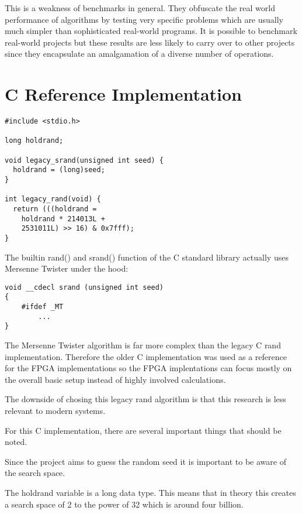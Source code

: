 \documentclass{article}
\begin{document}
    This is a weakness of benchmarks in general. They obfuscate the real world performance
    of algorithms by testing very specific problems which are usually much simpler
    than sophisticated real-world programs. It is possible to benchmark real-world
    projects but these results are less likely to carry over to other projects since
    they encapsulate an amalgamation of a diverse number of operations.

    \section{C Reference Implementation}

    \lstset{language=C}

    \begin{lstlisting}
#include <stdio.h>

long holdrand;

void legacy_srand(unsigned int seed) {
  holdrand = (long)seed;
}

int legacy_rand(void) {
  return (((holdrand =
    holdrand * 214013L +
    2531011L) >> 16) & 0x7fff);
}
    \end{lstlisting}

    The builtin rand() and srand() function of the C
    standard library actually uses Mersenne Twister under the
    hood:

    \begin{lstlisting}
void __cdecl srand (unsigned int seed)
{
    #ifdef _MT
        ...
}
    \end{lstlisting}

    The Mersenne Twister algorithm is far more complex
    than the legacy C rand implementation. Therefore the older
    C implementation was used as a reference for the FPGA
    implementations so the FPGA implentations can focus
    mostly on the overall basic setup instead of
    highly involved calculations.

    The downside of chosing this legacy rand algorithm is that
    this research is less relevant to modern systems.

    For this C implementation, there are several important things
    that should be noted.

    Since the project aims to guess the random seed it is important
    to be aware of the search space.

    The holdrand variable is a long data type. This means that in theory
    this creates a search space of 2 to the power of 32 which is around four billion.
\end{document}

